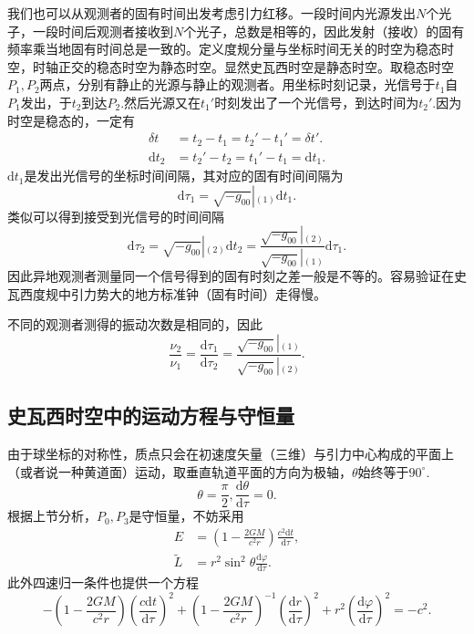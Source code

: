 \documentclass[11pt, a4paper, oneside, onecolumn]{ctexart}
\numberwithin{equation}{subsection}
\begin{document}
我们也可以从观测者的固有时间出发考虑引力红移。一段时间内光源发出$N$个光子，一段时间后观测者接收到$N$个光子，总数是相等的，因此发射（接收）的固有频率乘当地固有时间总是一致的。定义度规分量与坐标时间无关的时空为稳态时空，时轴正交的稳态时空为静态时空。显然史瓦西时空是静态时空。取稳态时空$P_{1},P_{2}$两点，分别有静止的光源与静止的观测者。用坐标时刻记录，光信号于$t_{1}$自$P_{1}$发出，于$t_{2}$到达$P_{2}$.然后光源又在$t_{1}'$时刻发出了一个光信号，到达时间为$t_{2}'$.因为时空是稳态的，一定有
\begin{align}
\delta{}t&=t_{2}-t_{1}=t_{2}'-t_{1}'=\delta{}t'.\\
\mathrm{d}t_{2}&=t_{2}'-t_{2}=t_{1}'-t_{1}=\mathrm{d}t_{1}.
\end{align}
$\mathrm{d}t_{1}$是发出光信号的坐标时间间隔，其对应的固有时间间隔为
\begin{equation}
\mathrm{d}\tau_{1}=\left.\sqrt{-g_{00}}\right\vert{}_{\left(1\right)}\mathrm{d}t_{1}.
\end{equation}
类似可以得到接受到光信号的时间间隔
\begin{equation}
\mathrm{d}\tau_{2}=\left.\sqrt{-g_{00}}\right\vert{}_{\left(2\right)}\mathrm{d}t_{2}=\frac{\left.\sqrt{-g_{00}}\right\vert{}_{\left(2\right)}}{\left.\sqrt{-g_{00}}\right\vert{}_{\left(1\right)}}\mathrm{d}\tau_{1}.
\end{equation}
因此异地观测者测量同一个信号得到的固有时刻之差一般是不等的。容易验证在史瓦西度规中引力势大的地方标准钟（固有时间）走得慢。

不同的观测者测得的振动次数是相同的，因此
\begin{equation}
\frac{\nu_{2}}{\nu_{1}}=\frac{\mathrm{d}\tau_{1}}{\mathrm{d}\tau_{2}}=\frac{\left.\sqrt{-g_{00}}\right\vert{}_{\left(1\right)}}{\left.\sqrt{-g_{00}}\right\vert{}_{\left(2\right)}}.
\end{equation}

\subsection{史瓦西时空中的运动方程与守恒量}
由于球坐标的对称性，质点只会在初速度矢量（三维）与引力中心构成的平面上（或者说一种黄道面）运动，取垂直轨道平面的方向为极轴，$\theta$始终等于$90^{\circ}$.
\begin{equation}
\theta=\frac{\pi}{2},\frac{\mathrm{d}\theta}{\mathrm{d}\tau}=0.
\end{equation}
根据上节分析，$P_{0},P_{3}$是守恒量，不妨采用
\begin{align}
E&=\left(1-\frac{2GM}{c^{2}r}\right)\frac{c^{2}\mathrm{d}t}{\mathrm{d}\tau},\\
\widetilde{L}&=r^{2}\sin^{2}\theta\frac{\mathrm{d}\varphi}{\mathrm{d}\tau}.
\end{align}
此外四速归一条件也提供一个方程
\begin{equation}
-\left(1-\frac{2GM}{c^{2}r}\right)\left(\frac{c\mathrm{d}t}{\mathrm{d}\tau}\right)^{2}+\left(1-\frac{2GM}{c^{2}r}\right)^{-1}\left(\frac{\mathrm{d}r}{\mathrm{d}\tau}\right)^{2}+r^{2}\left(\frac{\mathrm{d}\varphi}{\mathrm{d}\tau}\right)^{2}=-c^{2}.\label{4.4.4}
\end{equation}
\end{document}

